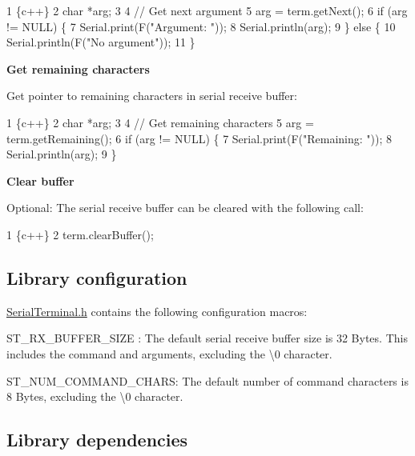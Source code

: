 \begin{DoxyCode}
1 \{c++\}
2 char *arg;
3 
4 // Get next argument
5 arg = term.getNext();
6 if (arg != NULL) \{
7     Serial.print(F("Argument: "));
8     Serial.println(arg);
9 \} else \{
10     Serial.println(F("No argument"));
11 \}
\end{DoxyCode}


{\bfseries Get remaining characters}

Get pointer to remaining characters in serial receive buffer\+:


\begin{DoxyCode}
1 \{c++\}
2 char *arg;
3 
4 // Get remaining characters
5 arg = term.getRemaining();
6 if (arg != NULL) \{
7     Serial.print(F("Remaining: "));
8     Serial.println(arg);
9 \}
\end{DoxyCode}


{\bfseries Clear buffer}

Optional\+: The serial receive buffer can be cleared with the following call\+:


\begin{DoxyCode}
1 \{c++\}
2 term.clearBuffer();
\end{DoxyCode}


\subsection*{Library configuration}

{\ttfamily \hyperlink{_serial_terminal_8h}{Serial\+Terminal.\+h}} contains the following configuration macro\textquotesingle{}s\+:


\begin{DoxyItemize}
\item {\ttfamily S\+T\+\_\+\+R\+X\+\_\+\+B\+U\+F\+F\+E\+R\+\_\+\+S\+I\+ZE} \+: The default serial receive buffer size is 32 Bytes. This includes the command and arguments, excluding the {\ttfamily \textquotesingle{}\textbackslash{}0\textquotesingle{}} character.
\item {\ttfamily S\+T\+\_\+\+N\+U\+M\+\_\+\+C\+O\+M\+M\+A\+N\+D\+\_\+\+C\+H\+A\+RS}\+: The default number of command characters is 8 Bytes, excluding the {\ttfamily \textquotesingle{}\textbackslash{}0\textquotesingle{}} character.
\end{DoxyItemize}

\subsection*{Library dependencies}


